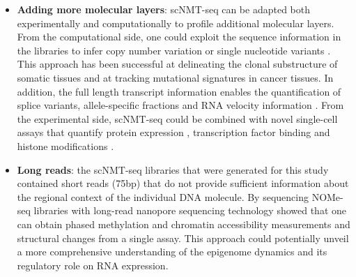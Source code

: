 \begin{itemize}
	\item \textbf{Adding more molecular layers}: scNMT-seq can be adapted both experimentally and computationally to profile additional molecular layers. From the computational side, one could exploit the sequence information in the libraries to infer copy number variation or single nucleotide variants \cite{Poirion2018,Fan2018,McCarthy2018,Enge2017}. This approach has been successful at delineating the clonal substructure of somatic tissues and at tracking mutational signatures in cancer tissues. In addition, the full length transcript information enables the quantification of splice variants\cite{Huang2017}, allele-specific fractions \cite{Deng2014} and RNA velocity information \cite{LaManno2018}. From the experimental side, scNMT-seq could be combined with novel single-cell assays that quantify protein expression \cite{Stoeckius2017}, transcription factor binding \cite{Moudgil2019} and histone modifications \cite{Kaya-Okur2019}.


	\item \textbf{Long reads}: the scNMT-seq libraries that were generated for this study contained short reads (75bp) that do not provide sufficient information about the regional context of the individual DNA molecule. By sequencing NOMe-seq libraries with long-read nanopore sequencing technology \cite{Lee2018} showed that one can obtain phased methylation and chromatin accessibility measurements and structural changes from a single assay. This approach could potentially unveil a more comprehensive understanding of the epigenome dynamics and its regulatory role on RNA expression.

\end{itemize}


